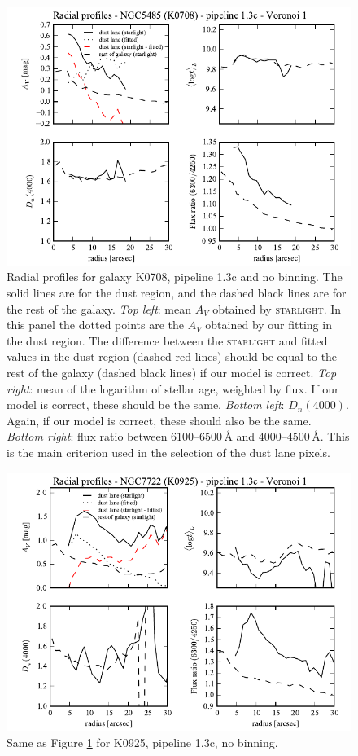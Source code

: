 \documentclass[a4paper]{article}
\newcommand{\angstrom}{\text{\AA}}
\def\starlight{\textsc{starlight}\xspace}
\begin{document}
\begin{figure}
\includegraphics{figures/radprof_K0708_1.3c_v01.pdf}

\caption{Radial profiles for galaxy K0708, pipeline 1.3c and no binning. The
solid lines are for the dust region, and the dashed black lines are for the rest
of the galaxy. {\em Top left}: mean $A_V$ obtained by \starlight. In this panel
the dotted points are the $A_V$ obtained by our fitting in the dust region. The
difference between the \starlight and fitted values in the dust region (dashed
red lines) should be equal to the rest of the galaxy (dashed black lines) if
our model is correct. {\em Top right}: mean of the logarithm of stellar age,
weighted by flux. If our model is correct, these should be the same. {\em Bottom
left}: $D_n(4000)$. Again, if our model is correct, these should also be the
same. {\em Bottom right}: flux ratio between $6100$--$6500\,\angstrom$ and
$4000$--$4500\,\angstrom$. This is the main criterion used in the selection of
the dust lane pixels.}
\label{fig:radprofK0708}
\end{figure}

\begin{figure}
\includegraphics{figures/radprof_K0925_1.3c_v01.pdf}

\caption{Same as Figure \ref{fig:radprofK0708} for K0925, pipeline 1.3c, no
binning.}
\label{fig:radprofK0925}
\end{figure}
\end{document}
